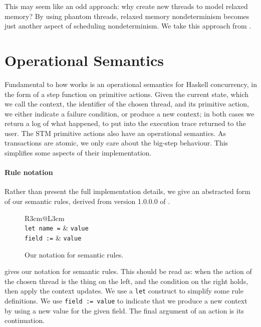 This may seem like an odd approach: why create new threads to model
relaxed memory?  By using phantom threads, relaxed memory
nondeterminism becomes just another aspect of scheduling
nondeterminism.  We take this approach from \cite{zhang2015}.

\section{Operational Semantics}
\label{sec:dejafu-semantics}

Fundamental to how \dejafu{} works is an operational semantics for
Haskell concurrency, in the form of a step function on primitive
actions.  Given the current state, which we call the context, the
identifier of the chosen thread, and its primitive action, we either
indicate a failure condition, or produce a new context; in both cases
we return a log of what happened, to put into the execution trace
returned to the user.  The STM primitive actions also have an
operational semantics.  As transactions are atomic, we only care about
the big-step behaviour.  This simplifies some aspects of their
implementation.

\paragraph{Rule notation}
Rather than present the full implementation details, we give an
abstracted form of our semantic rules, derived from version 1.0.0.0 of
\dejafu{}.

\begin{figure}
\centering
\footnotesize
\begin{tabular}{R{3cm}@{\hspace{0.5em}}L{3cm}}
 \\ \toprule
\texttt{let name =} & \texttt{value} \\ \midrule
  \texttt{field :=} & \texttt{value}
\end{tabular}
\caption{Our notation for semantic rules.}\label{fig:sem_notation}
\end{figure}

 gives our notation for semantic rules.  This
should be read as: when the action of the chosen thread is the thing
on the left, and the condition on the right holds, then apply the
context updates.  We use a \verb|let| construct to simplify some rule
definitions.  We use \verb|field := value| to indicate that we produce
a new context by using a new value for the given field.  The final
argument of an action is its continuation.

